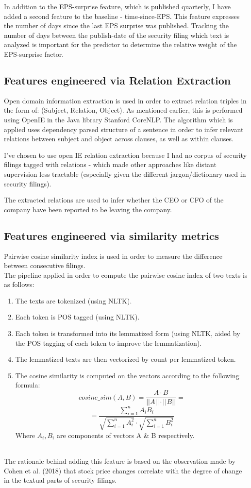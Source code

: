 \documentclass[11pt,a4paper]{article}
\begin{document}
In addition to the EPS-surprise feature, which is published quarterly, I have added a second feature to the baseline - time-since-EPS. This feature expresses the number of days since the last EPS surprise was published. Tracking the number of days between the publish-date of the security filing which text is analyzed is important for the predictor to determine the relative weight of the EPS-surprise factor.

\subsection{Features engineered via Relation Extraction}
Open domain information extraction is used in order to extract relation triples in the form of: (Subject, Relation, Object). As mentioned earlier, this is performed using OpenIE in the Java library Stanford CoreNLP. The algorithm which is applied uses dependency parsed structure of a sentence in order to infer relevant relations between subject and object across clauses, as well as within clauses.

I've chosen to use open IE relation extraction because I had no corpus of security filings tagged with relations - which made other approaches like distant supervision less tractable (especially given the different jargon/dictionary used in security filings).

The extracted relations are used to infer whether the CEO or CFO of the company have been reported to be leaving the company.

\subsection{Features engineered via similarity metrics}
Pairwise cosine similarity index is used in order to measure the difference between consecutive filings. \\
The pipeline applied in order to compute the pairwise cosine index of two texts is as follows:
\begin{enumerate}
  \item The texts are tokenized (using NLTK).
  \item Each token is POS tagged (using NLTK).
  \item Each token is transformed into its lemmatized form (using NLTK, aided by the POS tagging of each token to improve the lemmatization). 
  \item The lemmatized texts are then vectorized by count per lemmatized token.
  \item The cosine similarity is computed on the vectors according to the following formula:
  \[ cosine\_sim(A,B) = \frac{A \cdot B}{||A|| \cdot ||B||} = \]
  \[ = \frac{\sum_{i=1}^{n} A_i B_i}{\sqrt{\sum_{i=1}^{n} A_i^2} \cdot \sqrt{\sum_{i=1}^{n} B_i^2}} \]
  Where $A_i, B_i$ are components of vectors A \& B respectively.
\end{enumerate}
\\
The rationale behind adding this feature is based on the observation made by Cohen et al. (2018) that stock price changes correlate with the degree of change in the textual parts of security filings.
\end{document}
